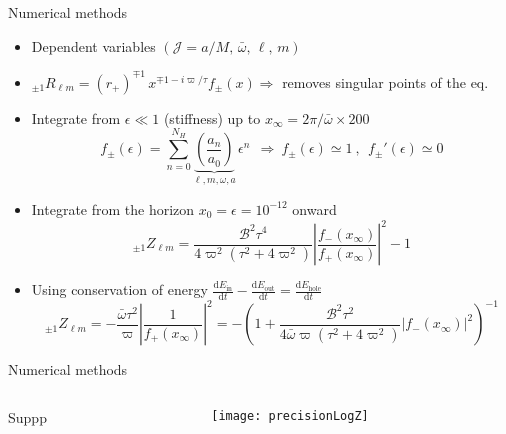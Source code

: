 \documentclass[9pt]{beamer}
\newcommand{\dd}{\mathrm{d}}
\newcommand{\uu}[3][]{ {}_{#1} #2_{#3} }
\begin{document}
\begin{frame}{Numerical methods}
	
	\begin{itemize}
		\item Dependent variables $(\mathscr{J} = a/M, \,\bar{\omega}, \, \ell, \, m)$
		
		\item
		$\uu[\pm 1]{R}{\ell m} = (r_+)^{\mp 1} \, x^{ \mp 1 - i \varpi / \tau} f_{\pm}(x) \Rightarrow$ removes singular points of the eq.
		
		\item
		Integrate from $\epsilon\ll 1$ (stiffness) up to $x_\infty = 2\pi/\bar{\omega} \times 200$
		$$ f_{\pm}(\epsilon) = \sum_{n=0}^{N_H} \underbrace{\left(\frac{a_n}{a_0}\right)}_\text{$\ell, m, \omega, a$} \,\epsilon^n  ~~\Rightarrow~ f_{\pm}{}(\epsilon) \simeq 1 ~,~~ f_{\pm}{}'(\epsilon) \simeq 0 $$
		
		\item
		Integrate from the horizon $x_0=\epsilon=10^{-12}$ onward
		$$ \uu[\pm 1]{Z}{\ell m} = \frac{\mathscr{B}^2 \tau^4 }{4 \varpi^2 (\tau^2 + 4 \varpi^2)} \left| \frac{f_{-}(x_\infty)}{f_{+}(x_\infty)} \right|^2 - 1 $$
		
		\item
		Using conservation of energy $\frac{\dd E_\mathrm{in}}{\dd t} - \frac{\dd E_\mathrm{out}}{\dd t} = \frac{\dd E_\mathrm{hole}}{\dd t}$
		$$ \uu[\pm 1]{Z}{\ell m} = - \frac{\bar{\omega} \tau^2}{\varpi} \left|\frac{1}{f_{+}(x_\infty)}\right|^2 = - \left( 1 + \frac{\mathscr{B}^2 \tau^2}{4 \bar{\omega} \varpi(\tau^2 + 4 \varpi^2)} \left|f_{-}(x_\infty)\right|^2 \right)^{-1}$$
		
	\end{itemize}
	
\end{frame}


\begin{frame}{Numerical methods}
	\begin{columns}
		\begin{column}{0.45\textwidth}
			Suppp
		\end{column}
		\begin{column}{0.55\textwidth}
			\texttt{[image: precisionLogZ]}
		\end{column}
	\end{columns}
\end{frame}
\end{document}
